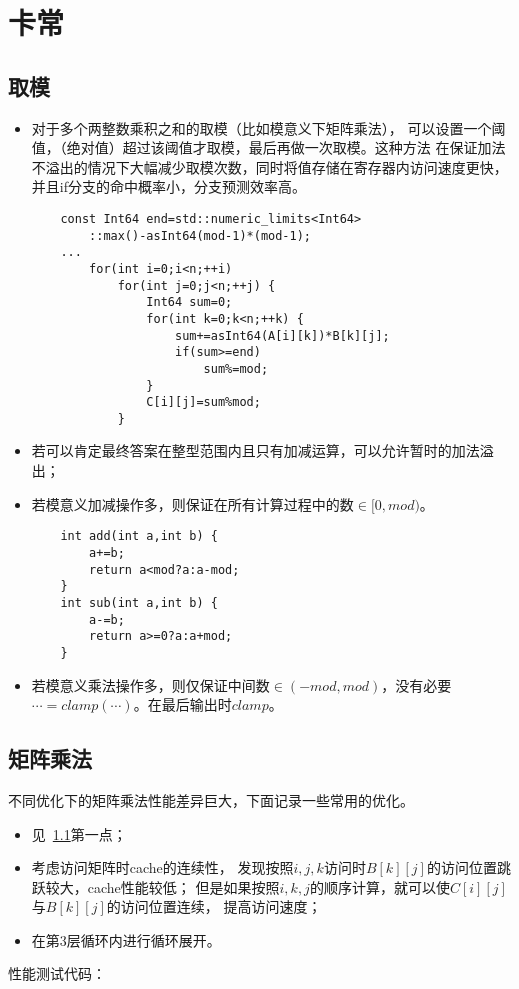 \section{卡常}
\subsection{取模}\label{mod}
\begin{itemize}
    \item 对于多个两整数乘积之和的取模（比如模意义下矩阵乘法），
    可以设置一个阈值，（绝对值）超过该阈值才取模，最后再做一次取模。这种方法
    在保证加法不溢出的情况下大幅减少取模次数，同时将值存储在寄存器内访问速度更快，
    并且if分支的命中概率小，分支预测效率高。
    \begin{lstlisting}
    const Int64 end=std::numeric_limits<Int64>
        ::max()-asInt64(mod-1)*(mod-1);
    ...
        for(int i=0;i<n;++i)
            for(int j=0;j<n;++j) {
                Int64 sum=0;
                for(int k=0;k<n;++k) {
                    sum+=asInt64(A[i][k])*B[k][j];
                    if(sum>=end)
                        sum%=mod;
                }
                C[i][j]=sum%mod;
            }
    \end{lstlisting}
    \item 若可以肯定最终答案在整型范围内且只有加减运算，可以允许暂时的加法溢出；
    \item 若模意义加减操作多，则保证在所有计算过程中的数$\in[0,mod)$。
    \begin{lstlisting}
    int add(int a,int b) {
        a+=b;
        return a<mod?a:a-mod;
    }
    int sub(int a,int b) {
        a-=b;
        return a>=0?a:a+mod;
    }
    \end{lstlisting}
    \item 若模意义乘法操作多，则仅保证中间数$\in (-mod,mod)$，没有必要
    $\cdots =clamp(\cdots)$。在最后输出时$clamp$。
\end{itemize}
\subsection{矩阵乘法}
不同优化下的矩阵乘法性能差异巨大，下面记录一些常用的优化。
\begin{itemize}
    \item 见~\ref{mod}第一点；
    \item 考虑访问矩阵时cache的连续性，
    发现按照$i,j,k$访问时$B[k][j]$的访问位置跳跃较大，cache性能较低；
    但是如果按照$i,k,j$的顺序计算，就可以使$C[i][j]$与$B[k][j]$的访问位置连续，
    提高访问速度；
    \item 在第3层循环内进行循环展开。
\end{itemize}
性能测试代码：



